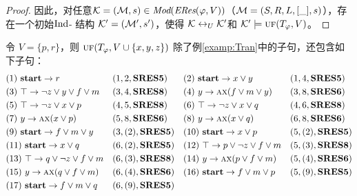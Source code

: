 \begin{proof}
	因此，对任意${\cal K}=({\cal M}, s)\in \textit{Mod}(\emph{ERes}(\varphi,V))$（${\cal M}=(S, R, L, [\_], s)$），存在一个初始$\textrm{Ind}$- 结构 ${\cal K}'=({\cal M}', s')$，使得 ${\cal K} \leftrightarrow_{U} {\cal K}'$和 ${\cal K}' \models \textsc{uf}(T_\varphi,V)$。
\end{proof}


\begin{example}\label{examp:Res}
	令 $V=\{p,r\}$，则  $\textsc{uf}(T_\varphi, V\cup \{x,y,z\})$ 除了例\ref{examp:Tran}中的子句，还包含如下子句：
	\begin{align*}
		&(1)\ \textbf{start} \rightarrow r && (1,2,\textbf{SRES5})
		&&(2)\ \textbf{start} \rightarrow x \vee y && (1,4,\textbf{SRES5})\\
		&(3)\ \top \rightarrow \neg z \vee y \vee f \vee m && (3, 4, \textbf{SRES8})
		&&(4)\ y \rightarrow \textsc{a}\textsc{x}(f\vee m\vee y) && (3,8, \textbf{SRES6})\\
		&(5)\ \top \rightarrow \neg z \vee x \vee p && (4,5, \textbf{SRES8})
		&&(6)\ \top \rightarrow \neg z \vee x \vee q && (4,6, \textbf{SRES8})\\
		&(7)\ y \rightarrow \textsc{a}\textsc{x}(x\vee p) && (5, 8, \textbf{SRES6})
		&&(8)\ y \rightarrow \textsc{a}\textsc{x}(x\vee q) && (6, 8, \textbf{SRES6})\\
		&(9)\ \textbf{start} \rightarrow f\vee m \vee y && (3,(2), \textbf{SRES5})
		&&(10)\ \textbf{start} \rightarrow x \vee p && (5,(2),\textbf{SRES5}) \\
		&(11)\ \textbf{start} \rightarrow x \vee q && (6,(2), \textbf{SRES5})
		&& (12)\ \top \rightarrow p \vee \neg z \vee f \vee m && (5,(3), \textbf{SRES8})\\
		& (13)\ \top \rightarrow q \vee \neg z \vee f \vee m && (6,(3), \textbf{SRES8})
		&&(14)\ y \rightarrow \textsc{a}\textsc{x}(p \vee f\vee m) && (5, (4), \textbf{SRES6})\\
		&(15)\ y \rightarrow \textsc{a}\textsc{x}(q \vee f\vee m) && (6, (4), \textbf{SRES6})
		&&(16)\ \textbf{start} \rightarrow f\vee m \vee p && (5, (9), \textbf{SRES5}) \\
		&(17)\ \textbf{start} \rightarrow f\vee m \vee q && (6, (9), \textbf{SRES5})
	\end{align*}
	

\end{example}
